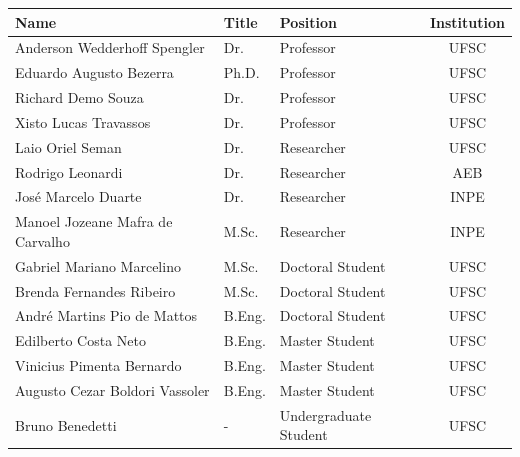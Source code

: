 \begin{table}[!htb]
    \centering
    \begin{tabular}{lllc}
        \toprule[1.5pt]
        \textbf{Name} & \textbf{Title} & \textbf{Position} & \textbf{Institution} \\
        \midrule
        Anderson Wedderhoff Spengler        & Dr.       & Professor             & UFSC \\
        Eduardo Augusto Bezerra             & Ph.D.     & Professor             & UFSC \\
        Richard Demo Souza                  & Dr.       & Professor             & UFSC \\
        Xisto Lucas Travassos               & Dr.       & Professor             & UFSC \\
        Laio Oriel Seman                    & Dr.       & Researcher            & UFSC \\
        Rodrigo Leonardi                    & Dr.       & Researcher            & AEB \\
        José Marcelo Duarte                 & Dr.       & Researcher            & INPE \\
        Manoel Jozeane Mafra de Carvalho    & M.Sc.     & Researcher            & INPE \\
        Gabriel Mariano Marcelino           & M.Sc.     & Doctoral Student      & UFSC \\
        Brenda Fernandes Ribeiro            & M.Sc.     & Doctoral Student      & UFSC \\
        André Martins Pio de Mattos         & B.Eng.    & Doctoral Student      & UFSC \\
        Edilberto Costa Neto                & B.Eng.    & Master Student      & UFSC \\
        Vinicius Pimenta Bernardo           & B.Eng.    & Master Student      & UFSC \\
        Augusto Cezar Boldori Vassoler      & B.Eng.    & Master Student      & UFSC \\
        Bruno Benedetti                     & -         & Undergraduate Student & UFSC \\

\end{tabular}
\end{table}
